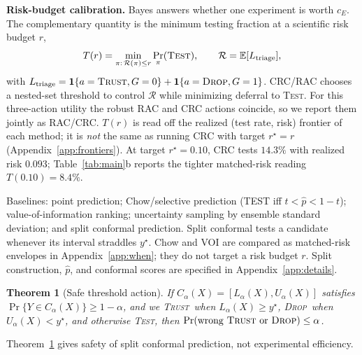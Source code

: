 \documentclass{article}
\newtheorem{theorem}{Theorem}
\newcommand{\test}{\textsc{Test}}
\newcommand{\trust}{\textsc{Trust}}
\newcommand{\dropa}{\textsc{Drop}}
\newcommand{\risk}{\mathcal{R}}
\begin{document}
\textbf{Risk-budget calibration.}
Bayes answers whether one experiment is worth $c_E$.
The complementary quantity is the minimum testing fraction at a scientific risk budget $r$,
\[
T(r)=\min_{\pi:\,\risk(\pi)\le r}\Pr_\pi(\test),
\qquad
\risk=\mathbb{E}[L_{\mathrm{triage}}],
\]
with
$L_{\mathrm{triage}}=\mathbf{1}\{a=\trust,G=0\}+\mathbf{1}\{a=\dropa,G=1\}$.
CRC/RAC chooses a nested-set threshold to control $\risk$ while minimizing deferral to \test.
For this three-action utility the robust RAC and CRC actions coincide, so we report them jointly as RAC/CRC.
$T(r)$ is read off the realized (test rate, risk) frontier of each method; it is \emph{not} the same as running CRC with target $r^\star=r$
(Appendix~\ref{app:frontiers}).
At target $r^\star=0.10$, CRC tests $14.3\%$ with realized risk $0.093$; Table~\ref{tab:main}b reports the tighter matched-risk reading $T(0.10)=8.4\%$.

Baselines: point prediction; Chow/selective prediction (TEST iff $t<\hat p<1-t$); value-of-information ranking; uncertainty sampling by ensemble standard deviation; and split conformal prediction.
Split conformal tests a candidate whenever its interval straddles $y^\star$.
Chow and VOI are compared as matched-risk envelopes in Appendix~\ref{app:when}; they do not target a risk budget $r$.
Split construction, \(\hat p\), and conformal scores are specified in Appendix~\ref{app:details}.

\begin{theorem}[Safe threshold action]
\label{thm:cp}
If $C_\alpha(X)=[L_\alpha(X),U_\alpha(X)]$ satisfies
$\Pr\{Y\in C_\alpha(X)\}\ge1-\alpha$, and we \trust\ when $L_\alpha(X)\ge y^\star$, \dropa\ when $U_\alpha(X)<y^\star$, and otherwise \test, then $\Pr(\text{wrong \trust\ or \dropa})\le\alpha$.
\end{theorem}
Theorem~\ref{thm:cp} gives safety of split conformal prediction, not experimental efficiency.
\end{document}
